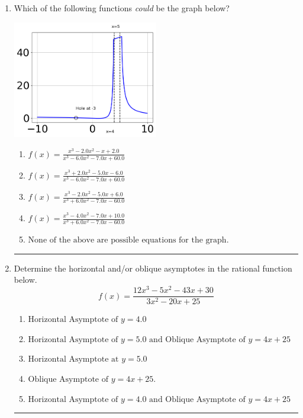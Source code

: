\documentclass[14pt]{extbook}
\newcommand{\litem}[1]{\item#1\hspace*{-1cm}\rule{\textwidth}{0.4pt}}
\begin{document}
\begin{enumerate}
{\begin{enumerate}[label=\Alph*.]
\end{enumerate} }
\litem{
Which of the following functions \textit{could} be the graph below?
\begin{center}
    \includegraphics[width=0.5\textwidth]{../Figures/identifyGraphOfRationalFunctionCopyB.png}
\end{center}
\begin{enumerate}[label=\Alph*.]
\item \( f(x)=\frac{x^{3} -2.0 x^{2} -x + 2.0}{x^{3} -6.0 x^{2} -7.0 x + 60.0} \)
\item \( f(x)=\frac{x^{3} +2.0 x^{2} -5.0 x -6.0}{x^{3} -6.0 x^{2} -7.0 x + 60.0} \)
\item \( f(x)=\frac{x^{3} -2.0 x^{2} -5.0 x + 6.0}{x^{3} +6.0 x^{2} -7.0 x -60.0} \)
\item \( f(x)=\frac{x^{3} -4.0 x^{2} -7.0 x + 10.0}{x^{3} +6.0 x^{2} -7.0 x -60.0} \)
\item \( \text{None of the above are possible equations for the graph.} \)

\end{enumerate} }
\litem{
Determine the horizontal and/or oblique asymptotes in the rational function below.\[ f(x) = \frac{12x^{3} -5 x^{2} -43 x + 30}{3x^{2} -20 x + 25} \]\begin{enumerate}[label=\Alph*.]
\item \( \text{Horizontal Asymptote of } y = 4.0  \)
\item \( \text{Horizontal Asymptote of } y = 5.0 \text{ and Oblique Asymptote of } y = 4x + 25 \)
\item \( \text{Horizontal Asymptote at } y = 5.0 \)
\item \( \text{Oblique Asymptote of } y = 4x + 25. \)
\item \( \text{Horizontal Asymptote of } y = 4.0 \text{ and Oblique Asymptote of } y = 4x + 25 \)


\end{enumerate}}
\end{enumerate}
\end{document}
